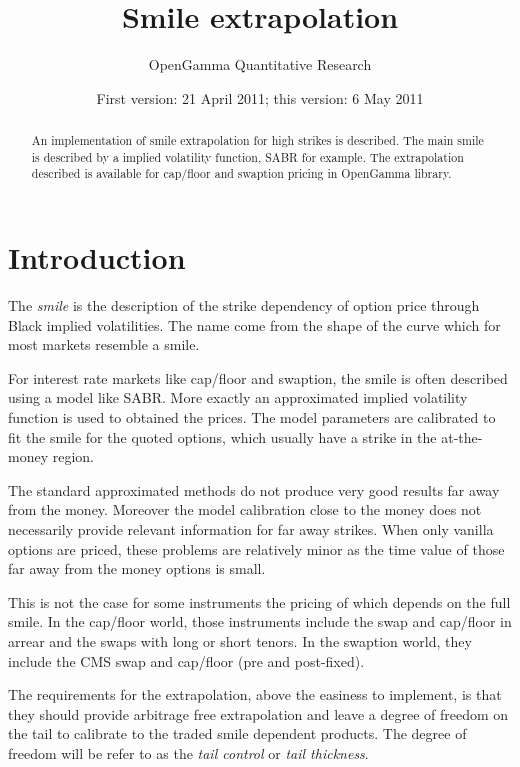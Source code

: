 \documentclass[]{amsart}
\title[Smile extrapolation]%
   {Smile extrapolation}
\author[OpenGamma]%
   {OpenGamma Quantitative Research}
\date{First version: 21 April 2011; this version: 6 May 2011}
\begin{document}
\maketitle

\begin{center}
\end{center}

\begin{abstract}
An implementation of smile extrapolation for high strikes is described. The main smile is described by a implied volatility function, SABR for example. The extrapolation described is available for cap/floor and swaption pricing in OpenGamma library.
\end{abstract}

\section{Introduction}

The \emph{smile} is the description of the strike dependency of option price through Black implied volatilities. The name come from the shape of the curve which for most markets resemble a smile.

For interest rate markets like cap/floor and swaption, the smile is often described using a model like SABR. More exactly an approximated implied volatility function is used to obtained the prices. The model parameters are calibrated to fit the smile for the quoted options, which usually have a strike in the at-the-money region.

The standard approximated methods do not produce very good results far away from the money. Moreover the model calibration close to the money does not necessarily provide relevant information for far away strikes. When only vanilla options are priced, these problems are relatively minor as the time value of those far away from the money options is small. 

This is not the case for some instruments the pricing of which depends on the full smile. In the cap/floor world, those instruments include the swap and cap/floor in arrear and the swaps with long or short tenors. In the swaption world, they include the CMS swap and cap/floor (pre and post-fixed).

The requirements for the extrapolation, above the easiness to implement, is that they should provide arbitrage free extrapolation and leave a degree of freedom on the tail to calibrate to the traded smile dependent products. The degree of freedom will be refer to as the \emph{tail control} or \emph{tail thickness}.
\end{document}
